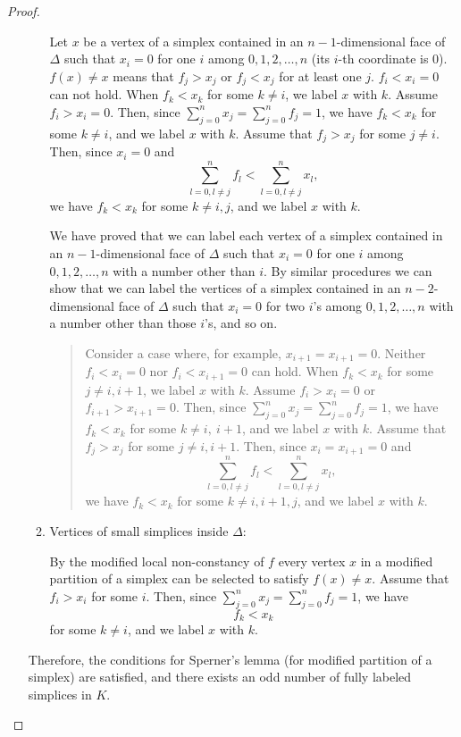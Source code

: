 \documentclass[reqno]{amsart}
\begin{document}
\begin{proof}
\begin{enumerate}
\begin{enumerate}
Let $x$ be a vertex of a simplex contained in an $n-1$-dimensional face of $\Delta$ such that $x_i=0$ for one $i$ among $0, 1, 2, \dots, n$ (its $i$-th coordinate is 0). $f(x)\neq x$ means that $f_j>x_j$ or $f_j<x_j$ for at least one $j$. $f_i<x_i=0$ can not hold. When $f_k<x_k$ for some $k\neq i$, we label $x$ with $k$. Assume $f_i>x_i=0$. Then, since $\sum_{j=0}^nx_j=\sum_{j=0}^nf_j=1$, we have $f_k<x_k$ for some $k\neq i$, and we label $x$ with $k$. Assume that $f_j>x_j$ for some $j\neq i$. Then, since $x_i=0$ and
\[\sum_{l=0, l\neq j}^n f_l<\sum_{l=0, l\neq j}^nx_l,\]
we have $f_k<x_k$ for some $k\neq i, j$, and we label $x$ with $k$.

We have proved that we can label each vertex of a simplex contained in an $n-1$-dimensional face of $\Delta$ such that $x_i=0$ for one $i$ among $0, 1, 2, \dots, n$ with a number other than $i$. By similar procedures we can show that we can label the vertices of a simplex contained in an $n-2$-dimensional face of $\Delta$ such that $x_i=0$ for two $i$'s among $0, 1, 2, \dots, n$ with a number other than those $i$'s, and so on.

\begin{quote}
Consider a case where, for example, $x_{i+1}=x_{i+1}=0$. Neither $f_i<x_i=0$ nor $f_i<x_{i+1}=0$ can hold. When $f_k<x_k$ for some $j\neq i, i+1$, we label $x$ with $k$. Assume $f_i>x_i=0$ or $f_{i+1}>x_{i+1}=0$. Then, since $\sum_{j=0}^nx_j=\sum_{j=0}^nf_j=1$, we have $f_k<x_k$ for some $k\neq i,\ i+1$, and we label $x$ with $k$. Assume that $f_j>x_j$ for some $j\neq i, i+1$. Then, since $x_i=x_{i+1}=0$ and
\[\sum_{l=0, l\neq j}^n f_l<\sum_{l=0, l\neq j}^nx_l,\]
we have $f_k<x_k$ for some $k\neq i, i+1, j$, and we label $x$ with $k$.
\end{quote}

	\item Vertices of small simplices inside $\Delta$:

By the modified local non-constancy of $f$ every vertex $x$ in a modified partition of a simplex can be selected to satisfy $f(x)\neq x$. Assume that $f_i>x_i$ for some $i$. Then, since $\sum_{j=0}^n x_j=\sum_{j=0}^n f_j=1$, we have
\[f_k<x_k\]
for some $k\neq i$, and we label $x$ with $k$.
\end{enumerate}

Therefore, the conditions for Sperner's lemma (for modified partition of a simplex) are satisfied, and there exists an odd number of fully labeled simplices in $K$.


\end{enumerate}
\end{proof}
\end{document}
